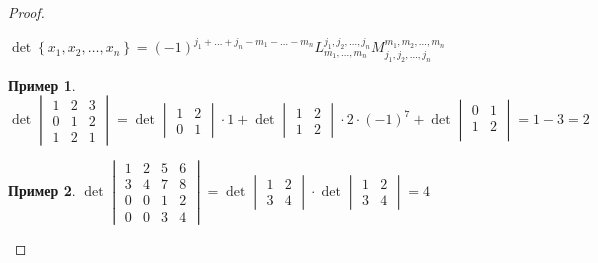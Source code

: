 \documentclass{book}
\theoremstyle{definition}
\newtheorem*{example}{Пример}
\begin{document}
\begin{enumerate}
\begin{proof}
        \begin{theorem}
            [Лапласа]
            $\det \left\{ x_1, x_2, \ldots, x_n \right\} = (-1)^{j_1+\ldots+j_n-m_1-\ldots-m_n}L_{m_1, \ldots, m_n}^{j_1, j_2, \ldots, j_n}M_{j_1, j_2, \ldots, j_n}^{m_1, m_2, \ldots, m_n}$
        \end{theorem}

        \begin{example}
            $\det
            \begin{vmatrix}
                1&2&3\\0&1&2\\1&2&1
            \end{vmatrix} = \det 
            \begin{vmatrix}
                1&2\\0&1
            \end{vmatrix}\cdot 1 + \det 
            \begin{vmatrix}
                1&2\\1&2
            \end{vmatrix}\cdot 2\cdot (-1)^7 + \det
            \begin{vmatrix}
                0&1\\1&2\\
            \end{vmatrix} = 1-3 = 2$
        \end{example}

        \begin{example}
             
            $ \det
            \begin{vmatrix}
            1&2&5&6\\3&4&7&8\\0&0&1&2\\ 0&0&3&4 
            \end{vmatrix} = \det
            \begin{vmatrix}
                1&2\\3&4
            \end{vmatrix}\cdot \det
            \begin{vmatrix}
                1&2\\3&4
            \end{vmatrix} = 4$
        \end{example}

        \end{proof}
\end{enumerate}
\end{document}
